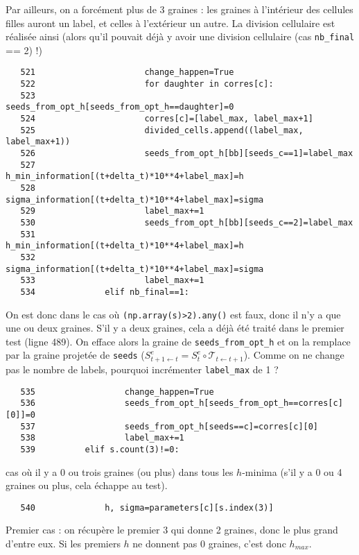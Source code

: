 \documentclass{article}
\def \mycolor {red}
\begin{document}
Par ailleurs, on a forc\'ement plus de 3 graines : les graines \`a l'int\'erieur des cellules filles auront un label, et celles \`a l'ext\'erieur un autre. La division cellulaire est r\'ealis\'ee ainsi (alors qu'il pouvait d\'ej\`a y avoir une division cellulaire (cas \verb|nb_final| == 2) !)

\color{black}
\begin{verbatim} 
   521	                    change_happen=True
   522	                    for daughter in corres[c]:
   523	                        seeds_from_opt_h[seeds_from_opt_h==daughter]=0
   524	                    corres[c]=[label_max, label_max+1]
   525	                    divided_cells.append((label_max, label_max+1))
   526	                    seeds_from_opt_h[bb][seeds_c==1]=label_max
   527	                    h_min_information[(t+delta_t)*10**4+label_max]=h
   528	                    sigma_information[(t+delta_t)*10**4+label_max]=sigma
   529	                    label_max+=1
   530	                    seeds_from_opt_h[bb][seeds_c==2]=label_max
   531	                    h_min_information[(t+delta_t)*10**4+label_max]=h
   532	                    sigma_information[(t+delta_t)*10**4+label_max]=sigma
   533	                    label_max+=1
   534	            elif nb_final==1:
\end{verbatim} 
\color{\mycolor}
On est donc dans le cas o\`u \verb|(np.array(s)>2).any()| est faux, donc il n'y a que une ou deux graines. S'il y a deux graines, cela a d\'ej\`a \'et\'e trait\'e dans le premier test (ligne 489). On efface alors la graine de \verb|seeds_from_opt_h| et on la remplace par la graine projet\'ee de \verb|seeds| ($S^e_{t+1 \leftarrow t} = S^e_t \circ \mathcal{T}_{t \leftarrow t+1}$). Comme on ne change pas le nombre de labels, pourquoi incr\'ementer \verb|label_max| de 1 ?
\color{black}
\begin{verbatim} 
   535	                change_happen=True
   536	                seeds_from_opt_h[seeds_from_opt_h==corres[c][0]]=0
   537	                seeds_from_opt_h[seeds==c]=corres[c][0]
   538	                label_max+=1
   539	        elif s.count(3)!=0:
\end{verbatim} 
\color{\mycolor}
cas o\`u il y a 0 ou trois graines (ou plus) dans tous les $h$-minima (s'il y a 0 ou 4 graines ou plus, cela \'echappe au test).
\color{black}
\begin{verbatim} 
   540	            h, sigma=parameters[c][s.index(3)]
\end{verbatim} 
\color{\mycolor}
Premier cas : on r\'ecup\`ere le premier $3$ qui donne 2 graines, donc le plus grand d'entre eux. Si les premiers $h$ ne donnent pas $0$ graines, c'est donc $h_{max}$.
\end{document}
